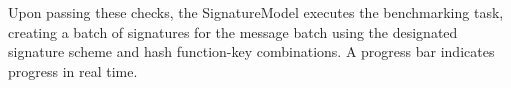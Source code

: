 \documentclass[]{final_report}
\theoremstyle{definition}
\begin{document}
Upon passing these checks, the SignatureModel executes the benchmarking task, creating a batch of signatures for the message batch using the designated signature scheme and hash function-key combinations. A progress bar indicates progress in real time.

\end{document}
